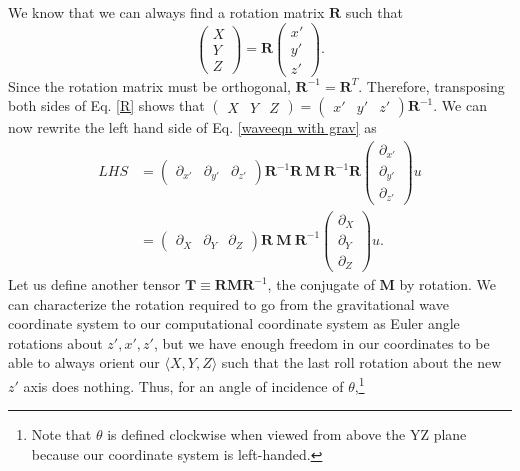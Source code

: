 \documentclass{article}
\begin{document}
We know that we can always find a rotation matrix $\textbf{R}$ such that
\begin{equation} \label{R}
\begin{pmatrix}
X \\
Y \\
Z
\end{pmatrix}=\textbf{R}\begin{pmatrix}
x\prime \\
y\prime \\
z\prime
\end{pmatrix}.
\end{equation} Since the rotation matrix must be orthogonal, $\textbf{R}^{-1}=\textbf{R}^T$. Therefore, transposing both sides of Eq. \ref{R} shows that $\begin{pmatrix} X & Y & Z\end{pmatrix} = \begin{pmatrix}x\prime & y\prime & z\prime\end{pmatrix}\textbf{R}^{-1}.$ We can now rewrite the left hand side of Eq. \ref{waveeqn with grav} as
\begin{align}
LHS &= \begin{pmatrix}\partial_{x\prime} & \partial_{y\prime} & \partial_{z\prime}\end{pmatrix} 
\textbf{R}^{-1}\textbf{R} \  \textbf{M} \ \textbf{R}^{-1}\textbf{R}
\begin{pmatrix} \partial_{x\prime} \\ \partial_{y\prime} \\ \partial_{z\prime} \end{pmatrix}
u \nonumber \\
&= \begin{pmatrix}\partial_X & \partial_Y & \partial_Z\end{pmatrix}
\textbf{R} \  \textbf{M} \ \textbf{R}^{-1}
\begin{pmatrix} \partial_X \\ \partial_Y \\ \partial_Z \end{pmatrix}
u. \label{LHS}
\end{align}
Let us define another tensor $\textbf{T}\equiv\textbf{RMR}^{-1}$, the conjugate of $\textbf{M}$ by rotation. We can characterize the rotation required to go from the gravitational wave coordinate system to our computational coordinate system as Euler angle rotations about $z\prime,x\prime,z\prime$, but we have enough freedom in our coordinates to be able to always orient our $\langle X,Y,Z\rangle$ such that the last roll rotation about the new $z\prime$ axis does nothing. Thus, for an angle of incidence of $\theta$,\footnote{Note that $\theta$ is defined clockwise when viewed from above the YZ plane because our coordinate system is left-handed.}
\end{document}
